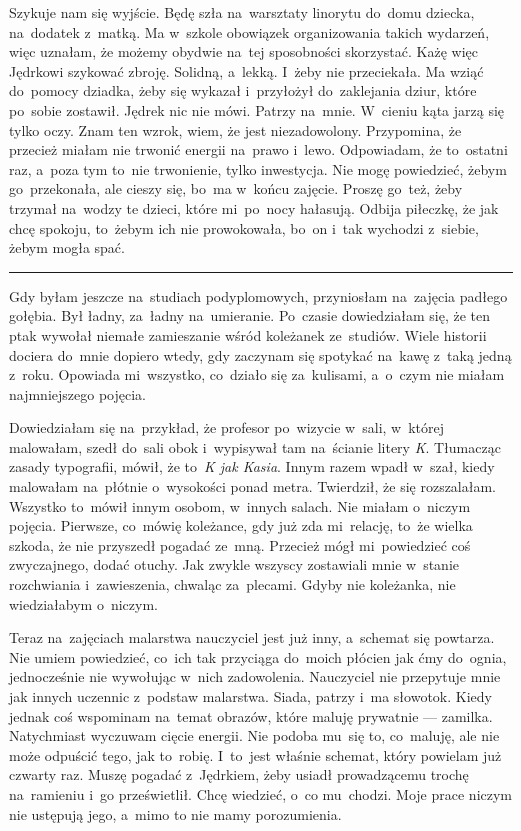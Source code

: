 \documentclass[9pt, a5paper]{memoir}
\begin{document}
Szykuje nam się wyjście. Będę szła na~warsztaty linorytu do~domu dziecka, na~dodatek z~matką. Ma w~szkole obowiązek organizowania takich wydarzeń, więc uznałam, że możemy obydwie na~tej sposobności skorzystać. Każę więc Jędrkowi szykować zbroję. Solidną, a~lekką. I~żeby nie przeciekała. Ma wziąć do~pomocy dziadka, żeby się wykazał i~przyłożył do~zaklejania dziur, które po~sobie zostawił. Jędrek nic nie mówi. Patrzy na~mnie. W~cieniu kąta jarzą się tylko oczy. Znam ten wzrok, wiem, że jest niezadowolony. Przypomina, że przecież miałam nie trwonić energii na~prawo i~lewo. Odpowiadam, że to~ostatni raz, a~poza tym to~nie trwonienie, tylko inwestycja. Nie mogę powiedzieć, żebym go~przekonała, ale cieszy się, bo~ma w~końcu zajęcie. Proszę go~też, żeby trzymał na~wodzy te dzieci, które mi~po~nocy hałasują. Odbija piłeczkę, że jak chcę spokoju, to~żebym ich nie prowokowała, bo~on i~tak wychodzi z~siebie, żebym mogła spać.

\fancybreak{* \quad * \quad *}

Gdy byłam jeszcze na~studiach podyplomowych, przyniosłam na~zajęcia padłego gołębia. Był ładny, za~ładny na~umieranie. Po~czasie dowiedziałam się, że ten ptak wywołał niemałe zamieszanie wśród koleżanek ze~studiów. Wiele historii dociera do~mnie dopiero wtedy, gdy zaczynam się spotykać na~kawę z~taką jedną z~roku. Opowiada mi~wszystko, co~działo się za~kulisami, a~o~czym nie miałam najmniejszego pojęcia.

Dowiedziałam się na~przykład, że profesor po~wizycie w~sali, w~której malowałam, szedł do~sali obok i~wypisywał tam na~ścianie litery \textit{K}. Tłumacząc zasady typografii, mówił, że to~\textit{K jak Kasia}. Innym razem wpadł w~szał, kiedy malowałam na~płótnie o~wysokości ponad metra. Twierdził, że się rozszalałam. Wszystko to~mówił innym osobom, w~innych salach. Nie miałam o~niczym pojęcia. Pierwsze, co~mówię koleżance, gdy już zda mi~relację, to~że wielka szkoda, że nie przyszedł pogadać ze~mną. Przecież mógł mi~powiedzieć coś zwyczajnego, dodać otuchy. Jak zwykle wszyscy zostawiali mnie w~stanie rozchwiania i~zawieszenia, chwaląc za~plecami. Gdyby nie koleżanka, nie wiedziałabym o~niczym.

Teraz na~zajęciach malarstwa nauczyciel jest już inny, a~schemat się powtarza. Nie umiem powiedzieć, co~ich tak przyciąga do~moich płócien jak ćmy do~ognia, jednocześnie nie wywołując w~nich zadowolenia. Nauczyciel nie przepytuje mnie jak innych uczennic z~podstaw malarstwa. Siada, patrzy i~ma słowotok. Kiedy jednak coś wspominam na~temat obrazów, które maluję prywatnie --- zamilka. Natychmiast wyczuwam cięcie energii. Nie podoba mu~się to, co~maluję, ale nie może odpuścić tego, jak to~robię. I~to~jest właśnie schemat, który powielam już czwarty raz. Muszę pogadać z~Jędrkiem, żeby usiadł prowadzącemu trochę na~ramieniu i~go prześwietlił. Chcę wiedzieć, o~co mu~chodzi. Moje prace niczym nie ustępują jego, a~mimo to nie mamy porozumienia.
\end{document}

